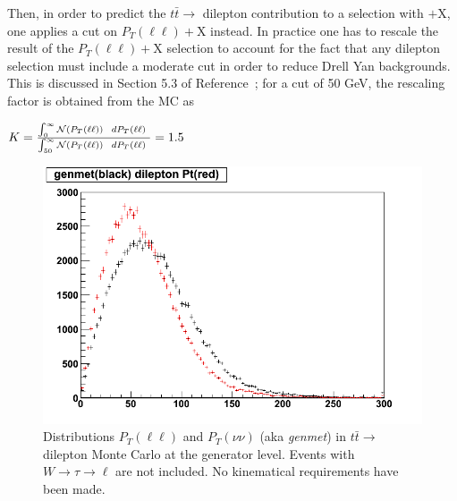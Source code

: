 Then, in order to predict the $t\bar{t} \to$ dilepton contribution to a 
selection with \met$+$X, one applies a cut on $P_T(\ell\ell)+$X instead.
In practice one has to rescale the result of the $P_T(\ell\ell)+$X selection
to account for the fact that any dilepton selection must include a 
moderate \met cut in order to reduce Drell Yan backgrounds.  This 
is discussed in Section 5.3 of Reference~\cite{ref:ourvictory}; for a \met
cut of 50 GeV, the rescaling factor is obtained from the MC as

\newcommand{\ptll} {\ensuremath{P_T(\ell\ell)}}
\begin{center}
$ K = \frac{\int_0^{\infty} {\cal N}(\ptll)~~d\ptll~}{\int_{50}^{\infty} {\cal N}(\ptll)~~d\ptll~} = 1.5$
\end{center}






\begin{figure}[bht]
\begin{center}
\includegraphics[width=0.75\linewidth]{genvictory_Dec13.png}
\caption{\label{fig:genvictory}\protect Distributions $P_T(\ell \ell)$
and $P_T(\nu \nu)$ (aka {\it genmet})
in $t\bar{t} \to$ dilepton Monte Carlo at the 
generator level.  Events with $W \to \tau \to \ell$ are not included.
No kinematical requirements have been made.} 
\end{center}
\end{figure}


